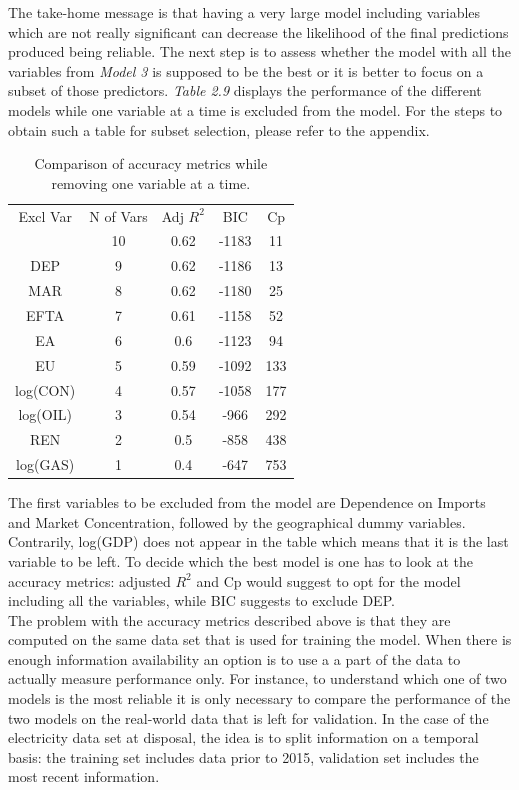 \documentclass{book}
\begin{document}
The take-home message is that having a very large model including variables which are not really significant can decrease the likelihood of the final predictions produced being reliable. The next step is to assess whether the model with all the variables from \textit{Model 3} is supposed to be the best or it is better to focus on a subset of those predictors. \textit{Table 2.9} displays the performance of the different models while one variable at a time is excluded from the model. For the steps to obtain such a table for subset selection, please refer to the appendix.

\bigskip
\begin{table}[H]
\begin{center}
\begin{tabular}{|c|c|c|c|c|}
\hline
\rowcolor{lightgray} \multicolumn{5}{|c|}{Subset Selection}\\
\hline
Excl Var&N of Vars&Adj $R^2$&BIC&Cp\\
\hline
&10&0.62&-1183&11\\
DEP&9&0.62&-1186&13\\
MAR&8&0.62&-1180&25\\
EFTA&7&0.61&-1158&52\\
EA&6&0.6&-1123&94\\
EU&5&0.59&-1092&133\\
log(CON)&4&0.57&-1058&177\\
log(OIL)&3&0.54&-966&292\\
REN&2&0.5&-858&438\\
log(GAS)&1&0.4&-647&753\\
\hline
\end{tabular}
\caption{Comparison of accuracy metrics while removing one variable at a time.}
\end{center}
\end{table}
\bigskip

The first variables to be excluded from the model are Dependence on Imports and Market Concentration, followed by the geographical dummy variables. Contrarily, log(GDP) does not appear in the table which means that it is the last variable to be left. To decide which the best model is one has to look at the accuracy metrics: adjusted $R^2$ and Cp would suggest to opt for the model including all the variables, while BIC suggests to exclude DEP.\\

The problem with the accuracy metrics described above is that they are computed on the same data set that is used for training the model. When there is enough information availability an option is to use a a part of the data to actually measure performance only. For instance, to understand which one of two models is the most reliable it is only necessary to compare the performance of the two models on the real-world data that is left for validation. In the case of the electricity data set at disposal, the idea is to split information on a temporal basis: the training set includes data prior to 2015, validation set includes the most recent information.\\
\end{document}
